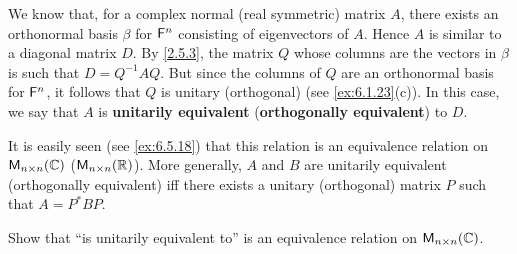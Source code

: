 \begin{defn}\label{6.5.13}
	We know that, for a complex normal (real symmetric) matrix \(A\), there exists an orthonormal basis \(\beta\) for \(\mathsf{F}^n\) consisting of eigenvectors of \(A\).
	Hence \(A\) is similar to a diagonal matrix \(D\).
	By \cref{2.5.3}, the matrix \(Q\) whose columns are the vectors in \(\beta\) is such that \(D = Q^{-1} A Q\).
	But since the columns of \(Q\) are an orthonormal basis for \(\mathsf{F}^n\), it follows that \(Q\) is unitary (orthogonal) (see \cref{ex:6.1.23}(c)).
	In this case, we say that \(A\) is \textbf{unitarily equivalent} (\textbf{orthogonally equivalent}) to \(D\).

	It is easily seen (see \cref{ex:6.5.18}) that this relation is an equivalence relation on \(\ms[n][n][\C]\) (\(\ms[n][n][\R]\)).
	More generally, \(A\) and \(B\) are unitarily equivalent (orthogonally equivalent) iff there exists a unitary (orthogonal) matrix \(P\) such that \(A = P^* B P\).
\end{defn}

\exercisesection

\begin{ex}\label{ex:6.5.18}
	Show that ``is unitarily equivalent to'' is an equivalence relation on \(\ms[n][n][\C]\).
\end{ex}

